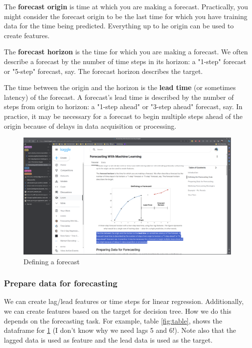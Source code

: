 \documentclass[12pt]{report}
\begin{document}
The \textbf{forecast origin} is time at which you are making a forecast. Practically, you might consider the forecast origin to be the last time for which you have training data for the time being predicted. Everything up to he origin can be used to create features.

The \textbf{forecast horizon} is the time for which you are making a forecast. We often describe a forecast by the number of time steps in its horizon: a "1-step" forecast or "5-step" forecast, say. The forecast horizon describes the target.

The time between the origin and the horizon is the \textbf{lead time} (or sometimes latency) of the forecast. A forecast's lead time is described by the number of steps from origin to horizon: a "1-step ahead" or "3-step ahead" forecast, say. In practice, it may be necessary for a forecast to begin multiple steps ahead of the origin because of delays in data acquisition or processing.

\begin{figure}[htbp]
  \begin{center}
    \includegraphics[trim =30cm 10.0cm 20cm 19cm, clip, scale=0.3]{pics/forecasting.png}
    \caption{Defining a forecast}
    \label{fig:forecast}
  \end{center}
\end{figure}


\subsubsection{Prepare data for forecasting}

We can create lag/lead features or time steps for linear regression. Additionally, we can create features based on the target for decision tree. How we do this depends on the forecasting task. For example, table \ref{fig:table}, shows the dataframe for \ref{fig:forecast} (I don't know why we need lags 5 and 6!). Note also that the lagged data is used as feature and the lead data is used as the target.
\end{document}
